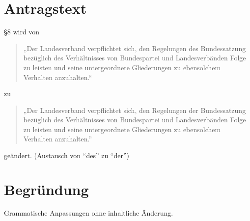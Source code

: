 \section{Antragstext}

§8 wird von

\begin{quote}
„Der Landesverband verpflichtet sich, den Regelungen des Bundessatzung bezüglich des Verhältnisses von Bundespartei und Landesverbänden Folge zu leisten und seine untergeordnete Gliederungen zu ebensolchem Verhalten anzuhalten.``

\end{quote}
zu

\begin{quote}
„Der Landesverband verpflichtet sich, den Regelungen der Bundessatzung bezüglich des Verhältnisses von Bundespartei und Landesverbänden Folge zu leisten und seine untergeordnete Gliederungen zu ebensolchem Verhalten anzuhalten.''

\end{quote}
geändert. (Austausch von ``des'' zu ``der'')

\section{Begründung}

Grammatische Anpassungen ohne inhaltliche Änderung.
